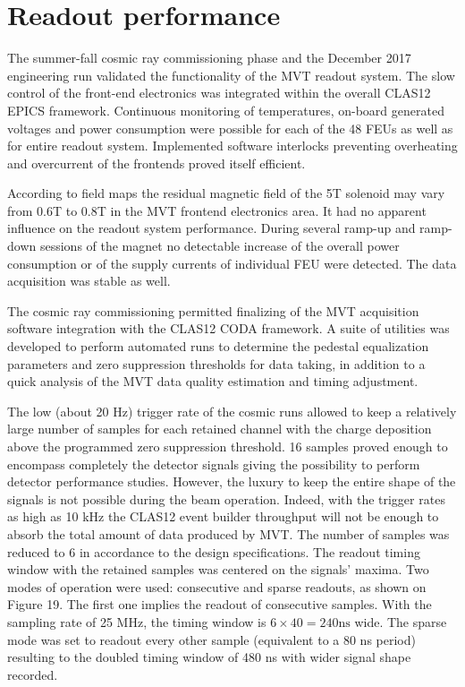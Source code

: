 
\section{Readout performance}

The summer-fall cosmic ray commissioning phase and the December 2017 engineering run validated the functionality of the 
MVT readout system. The slow control of the front-end electronics was integrated within the overall CLAS12 EPICS 
framework. Continuous monitoring of temperatures, on-board generated voltages and power consumption were possible for 
each of the 48 FEUs as well as for entire readout system. Implemented software interlocks preventing overheating and 
overcurrent of the frontends proved itself efficient.

According to field maps the residual magnetic field of the 5T solenoid may vary from 0.6T to 0.8T in the MVT frontend 
electronics area. It had no apparent influence on the readout system performance. During several ramp-up and ramp-down 
sessions of the magnet no detectable increase of the overall power consumption or of the supply currents of individual 
FEU were detected. The data acquisition was stable as well.

The cosmic ray commissioning permitted finalizing of the MVT acquisition software integration with the CLAS12 CODA 
framework. A suite of utilities was developed to perform automated runs to determine the pedestal equalization 
parameters and zero suppression thresholds for data taking, in addition to a quick analysis of the MVT data quality 
estimation and timing adjustment.

The low (about 20 Hz) trigger rate of the cosmic runs allowed to keep a relatively large number of samples for each 
retained channel with the charge deposition above the programmed zero suppression threshold. 16 samples proved enough 
to encompass completely the detector signals giving the possibility to perform detector performance studies. However, 
the luxury to keep the entire shape of the signals is not possible during the beam operation. Indeed, with the trigger 
rates as high as 10 kHz the CLAS12 event builder throughput will not be enough to absorb the total amount of data 
produced by MVT. The number of samples was reduced to 6 in accordance to the design specifications. The readout timing 
window with the retained samples was centered on the signals' maxima. Two modes of operation were used: consecutive and 
sparse readouts, as shown on Figure 19. The first one implies the readout of consecutive samples. With the sampling rate 
of 25 MHz, the timing window is $6 \times 40 = 240 \text{ns}$ wide. The sparse mode was set to readout every other 
sample (equivalent to a 80 ns period) resulting to the doubled timing window of 480 ns with wider signal shape recorded.


